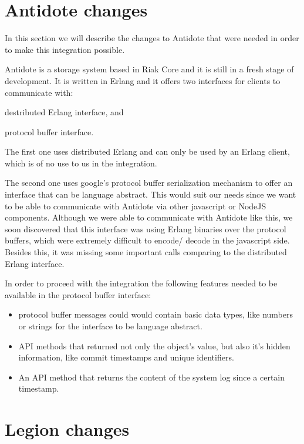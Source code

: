 \section{Antidote changes}
\label{sec:antidote_changes}
In this section we will describe the changes to Antidote that were needed in order to make this integration possible.\par
	Antidote is a storage system based in Riak Core and it is still in a fresh stage of development. It is written in Erlang and it offers two interfaces for clients to communicate with: 
\begin{enumerate*}[(i)]
\item destributed Erlang interface, and 
\item protocol buffer interface.
\end{enumerate*}
\par
	The first one uses distributed Erlang and can only be used by an Erlang client, which is of no use to us in the integration.\par
	The second one uses google's protocol buffer serialization mechanism to offer an interface that can be language abstract. This would suit our needs since we want to be able to communicate with Antidote via other javascript or NodeJS components. Although we were able to communicate with Antidote like this, we soon discovered that this interface was using Erlang binaries over the protocol buffers, which were extremely difficult to encode/ decode in the javascript side. Besides this, it was missing some important calls comparing to the distributed Erlang interface.\par
	In order to proceed with the integration the following features needed to be available in the protocol buffer interface:
	\begin{itemize}
	\item protocol buffer messages could would contain basic data types, like numbers or strings for the interface to be language abstract.
	\item API methods that returned not only the object's value, but also it's hidden information, like commit timestamps and unique identifiers.
	\item An API method that returns the content of the system log since a certain timestamp. 
	\end{itemize}

\section{Legion changes}
\label{sec:legion_changes}

